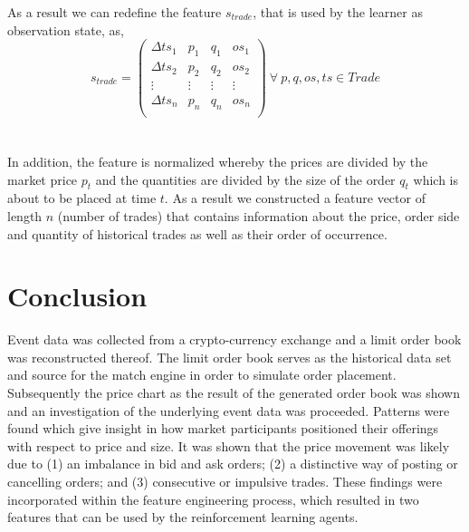 As a result we can redefine the feature $s_{trade}$, that is used by the learner as observation state, as,
\begin{equation}
    s_{trade} =\begin{pmatrix}
        \Delta{ts_1} & p_1 & q_1 & os_1 \\
        \Delta{ts_2} & p_2 & q_2 & os_2 \\
        \vdots & \vdots & \vdots & \vdots\\
        \Delta{ts_n} & p_n & q_n & os_n \\
    \end{pmatrix}
    \ \forall \ p, q, os, ts \in Trade
\end{equation}
\hfill
\\
\\
In addition, the feature is normalized whereby the prices are divided by the market price $p_t$ and the quantities are divided by the size of the order $q_t$ which is about to be placed at time $t$.
As a result we constructed a feature vector of length $n$ (number of trades) that contains information about the price, order side and quantity of historical trades as well as their order of occurrence.

\section{Conclusion}

Event data was collected from a crypto-currency exchange and a limit order book was reconstructed thereof.
The limit order book serves as the historical data set and source for the match engine in order to simulate order placement. 
Subsequently the price chart as the result of the generated order book was shown and an investigation of the underlying event data was proceeded.
Patterns were found which give insight in how market participants positioned their offerings with respect to price and size.
It was shown that the price movement was likely due to (1) an imbalance in bid and ask orders; (2) a distinctive way of posting or cancelling orders; and (3) consecutive or impulsive trades.
These findings were incorporated within the feature engineering process, which resulted in two features that can be used by the reinforcement learning agents.
